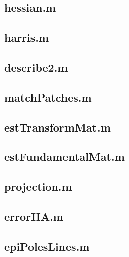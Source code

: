 \documentclass[a4paper, 10pt, conference]{ieeeconf}
\begin{document}
\subsection*{hessian.m}

\newpage

\subsection*{harris.m}

\newpage

\subsection*{describe2.m}

\newpage

\subsection*{matchPatches.m}

\newpage

\subsection*{estTransformMat.m}

\newpage

\subsection*{estFundamentalMat.m}

\newpage

\subsection*{projection.m}

\newpage

\subsection*{errorHA.m}

\newpage

\subsection*{epiPolesLines.m}

\newpage
\end{document}
